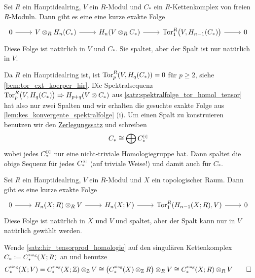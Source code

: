 \begin{satz}[label=satz:hir_tensorprod_homologie,name={Universelles Koeffizienten-Theorem für Homologie von Kettenkomplexen}]
	Sei $R$ ein Hauptidealring, $V$ ein $R$-Modul und $C_*$ ein $R$-Kettenkomplex von freien $R$-Moduln.
	Dann gibt es eine eine kurze exakte Folge
	\[
		\begin{tikzcd}
			0 \rar & V \otimes_R H_n(C_*) \rar & H_n(V \otimes_R C_*) \rar & \Tor_1^R \enbrace[\big]{V, H_{n-1}(C_*)} \rar & 0
		\end{tikzcd}
	\]
	Diese Folge ist natürlich in $V$ und $C_*$.
	Sie spaltet, aber der Spalt ist nur natürlich in $V$.
\end{satz}
\begin{beweis}
	Da $R$ ein Hauptidealring ist, ist $\Tor^R_p \enbrace*{V, H_q(C_*)}=0$ für $p \ge 2$, siehe \autoref{bem:tor_ext_koerper_hir}.
	Die Spektralsequenz $\Tor_p^R\enbrace[\big]{V, H_q(C_*)} \Rightarrow H_{p+q}(V \otimes C_*)$ aus \autoref{satz:spektralfolge_tor_homol_tensor} hat also nur zwei Spalten und wir erhalten die gesuchte exakte Folge aus \autoref{lem:kes_konvergente_spektralfolge} (i).
	Um einen Spalt zu konstruieren benutzen wir den \hyperref[zerlegungssatz]{Zerlegungssatz} und schreiben 
	\[
		C_* \cong \bigoplus C_*^\ssbbrace{i}
	\]
	wobei jedes $C_*^\ssbbrace{i}$ nur eine nicht-triviale Homologiegruppe hat.
	Dann spaltet die obige Sequenz für jedes $C_*^\ssbbrace{i}$ (auf triviale Weise!) und damit auch für $C_*$.
\end{beweis}

\begin{satz}[{name={Universelles Koeffizienten-Theorem für Homologie von Räumen}},label=satz:univ_koeff_homo_space]
	Sei $R$ ein Hauptidealring, $V$ ein $R$-Modul und $X$ ein topologischer Raum.
	Dann gibt es eine kurze exakte Folge 
	\[
		\begin{tikzcd}
			0 \rar & H_n(X;R) \otimes_R V \rar & H_n(X;V) \rar & \Tor_1^R \enbrace*{H_{n-1}(X;R),V} \rar & 0
		\end{tikzcd}
	\] 
	Diese Folge ist natürlich in $X$ und $V$ und spaltet, aber der Spalt kann nur in $V$ natürlich gewählt werden.
\end{satz}
\begin{beweis}
	Wende \autoref{satz:hir_tensorprod_homologie} auf den singulären Kettenkomplex $C_* := C_*^\sing(X;R)$ an und benutze 
	\[
		C_*^\sing(X;V) = C^\sing_*(X;\mathbb{Z}) \otimes_\mathbb{Z} V \cong \enbrace*{C_*^\sing(X) \otimes_\mathbb{Z} R} \otimes_R V \cong C_*^\sing(X;R) \otimes_R V \qedhere
	\]
\end{beweis}


